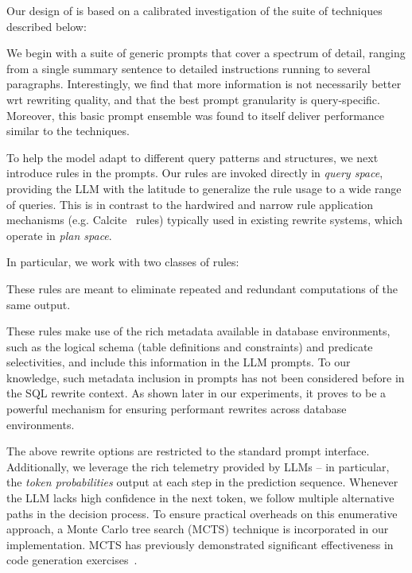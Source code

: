 Our design of \lithe is based on a calibrated investigation of the suite of techniques described below:

We begin with a suite of generic prompts that cover a spectrum of detail, ranging from a single summary sentence to detailed instructions running to several paragraphs. Interestingly, we find that more information is not necessarily better wrt rewriting quality, and that the best prompt granularity is query-specific. Moreover, this basic prompt ensemble was found to itself deliver performance similar to the \sota techniques.

%
To help the model adapt to different query patterns and structures, we next introduce rules in the prompts. Our rules are invoked directly in \emph{query space}, providing the LLM with the latitude to generalize the rule usage to a wide range of queries. This is in contrast to the hardwired and narrow rule application mechanisms (e.g. Calcite~\cite{Calcite} rules) typically used in existing rewrite systems,  which operate in \emph{plan space}. 

%
In particular, we work with two classes of rules:

 These rules are meant to eliminate repeated and redundant computations of the same output.  

%
These rules make use of the rich metadata available in database environments, such as the logical schema (table definitions and constraints) and predicate selectivities, and include this information in the LLM prompts. To our knowledge, such metadata inclusion in prompts has not been considered before in the SQL rewrite context. As shown later in our experiments, it proves to be a powerful mechanism for ensuring performant rewrites across database environments.

%
The above rewrite options are restricted to the standard prompt interface. Additionally, we leverage the rich telemetry provided by LLMs -- in particular, the  \emph{token probabilities} output at each step in the prediction sequence. Whenever the LLM lacks high confidence in the next token, we follow multiple alternative paths in the decision process. To ensure practical overheads on this enumerative approach, a Monte Carlo tree search (MCTS) technique is incorporated in our implementation. MCTS has previously demonstrated significant effectiveness in code generation exercises~\cite{CodeGen}.

